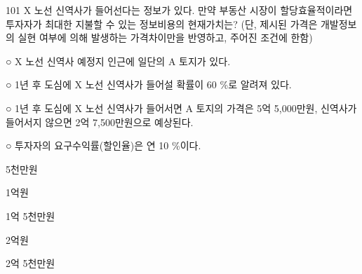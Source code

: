 \begin{question}{101}
X 노선 신역사가 들어선다는 정보가 있다. 만약 부동산 시장이 할당효율적이라면 투자자가 최대한 지불할 수 있는 정보비용의 현재가치는? (단, 제시된 가격은 개발정보의 실현 여부에 의해 발생하는 가격차이만을 반영하고, 주어진 조건에 한함)
\begin{framedtext}
○ X 노선 신역사 예정지 인근에 일단의 A 토지가 있다. \par
○ 1년 후 도심에 X 노선 신역사가 들어설 확률이 60 \%로 알려져 있다. \par
○ 1년 후 도심에 X 노선 신역사가 들어서면 A 토지의 가격은 5억 5,000만원, 신역사가 들어서지 않으면 2억 7,500만원으로 예상된다. \par
○ 투자자의 요구수익률(할인율)은 연 10 \%이다. \par
\end{framedtext}
\begin{choices}
  \item 5천만원
  \item 1억원
  \item 1억 5천만원
  \item 2억원
  \item 2억 5천만원
\end{choices}
\end{question}
